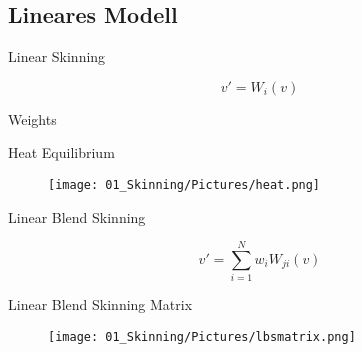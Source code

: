\subsection{Lineares Modell}

	\begin{frame}{\Huge{Linear Skinning}}
		
		$$v'=W_{i}(v)$$
		
		
	\end{frame}

{ %
	\begin{frame}{\Huge{Weights}}
		
		
		
		
	\end{frame}
} %

	\begin{frame}{\Huge{Heat Equilibrium}}
		
		\begin{figure}
			\texttt{[image: 01\_Skinning/Pictures/heat.png]}
		\end{figure}
		
		
		
	\end{frame}
	
	\begin{frame}{\Huge{Linear Blend Skinning}}
		
		$$v'=\sum_{i=1}^{N}w_{i}W_{ji}(v)$$
		
		
	\end{frame}
	
		\begin{frame}{\Huge{Linear Blend Skinning Matrix}}
			
			\begin{figure}
				\texttt{[image: 01\_Skinning/Pictures/lbsmatrix.png]}
			\end{figure}
			
			
			
		\end{frame}
		
